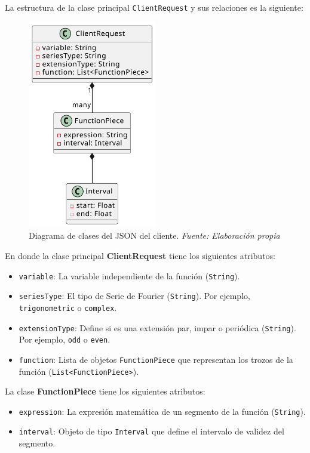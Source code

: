 La estructura de la clase principal \texttt{ClientRequest} y sus relaciones es la siguiente:

\begin{figure}[H]
	\centering
	\includegraphics[width=0.5\textwidth]{img/chapter04/DC_JSON_Client.pdf}
	\caption[Diagrama de clases del JSON del cliente.]{Diagrama de clases del JSON del cliente. \textit{Fuente: \textit{Elaboración propia}}}
	\label{fig:Diagrama_clase_cliente}
\end{figure}


En donde la clase principal \textbf{ClientRequest} tiene los siguientes atributos:
\begin{itemize}
	\item \texttt{variable}: La variable independiente de la función (\texttt{String}).
	\item \texttt{seriesType}: El tipo de Serie de Fourier (\texttt{String}). Por ejemplo, \texttt{trigonometric} o \texttt{complex}.
	\item \texttt{extensionType}: Define si es una extensión par, impar o periódica (\texttt{String}). Por ejemplo, \texttt{odd} o \texttt{even}.
	\item \texttt{function}: Lista de objetos \texttt{FunctionPiece} que representan los trozos de la función (\texttt{List<FunctionPiece>}).
\end{itemize}

	
La clase \textbf{FunctionPiece} tiene los siguientes atributos: 
\begin{itemize}
	\item \texttt{expression}: La expresión matemática de un segmento de la función (\texttt{String}).
	\item \texttt{interval}: Objeto de tipo \texttt{Interval} que define el intervalo de validez del segmento.
\end{itemize}

